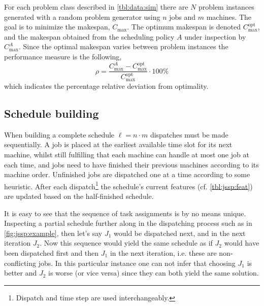 \documentclass[smallextended]{svjour3}
\begin{document}
For each problem class described in \cref{tbl:data:sim} there are $N$
problem instances generated with a random problem generator using $n$
jobs and $m$ machines.  The goal is to minimize the makespan,
$C_{\max}$. The optimum makespan is denoted $C_{\max}^{\text{opt}}$,
and the makespan obtained from the scheduling policy $A$ under
inspection by $C_{\max}^{A}$. Since the optimal makespan varies
between problem instances the performance measure is the following,
\begin{equation}\label{eq:ratio}\rho=\frac{C_{\max}^{A}-C_{\max}^{\text{opt}}}{C_{\max}^{\text{opt}}}\cdot
  100\%\end{equation}
	which indicates the percentage relative deviation from optimality. %
	
\subsection{Schedule building}\label{sec:gen:gametree}
When building a complete schedule $\ell=n\cdot m$ dispatches must be
made sequentially.  A job is placed at the earliest available time
slot for its next machine, whilst still fulfilling that each machine
can handle at most one job at each time, and jobs need to have
finished their previous machines according to its machine order.
Unfinished jobs are dispatched one at a time according to some
heuristic. After each dispatch\footnote{Dispatch and time step are
  used interchangeably.} the schedule's current features
(cf. \cref{tbl:jssp:feat}) are updated based on the half-finished
schedule.
	
It is easy to see that the sequence of task assignments is by no means
unique. Inspecting a partial schedule further along in the dispatching
process such as in \cref{fig:jssp:example}, then let's say $J_1$ would
be dispatched next, and in the next iteration $J_2$. Now this sequence
would yield the same schedule as if $J_2$ would have been dispatched
first and then $J_1$ in the next iteration, i.e. these are
non-conflicting jobs.  In this particular instance one can not infer
that choosing $J_1$ is better and $J_2$ is worse (or vice versa) since
they can both yield the same solution.
	
\end{document}
